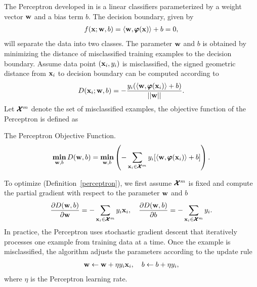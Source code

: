 {The Perceptron developed in \citep{Rosenblatt58,Rosenblatt62} is a linear classifiers parameterized by a weight vector $\mathbf {w}$ and a bias term $b$. 
The decision boundary, given by 
\begin{align*}
	f(\mathbf {x};\mathbf {w},b) = \langle \mathbf {w}, \pmb \varphi(\mathbf {x}) \rangle + b =0,
\end{align*}
will separate the data into two classes.
The parameter $\mathbf {w}$ and $b$ is obtained by minimizing the distance of misclassified training examples to the decision boundary.
Assume data point $(\mathbf {x}_i,y_i)$ is misclassified, the signed geometric distance from $\mathbf {x}_i$ to decision boundary can be computed according to
\begin{align*}
	D(\mathbf {x}_i;\mathbf {w},b) = -\frac{y_i(\langle \mathbf {w}, \pmb \varphi(\mathbf {x}_i) \rangle+b)}{\left|\left| \mathbf {w} \right|\right|}.
\end{align*}
Let $\pmb {\mathcal{X}}^m$ denote the set of misclassified examples, the objective function of the Perceptron is defined as
\begin{definition}{The Perceptron Objective Function.}\label{perceptron}
	\begin{align*}
		\underset{\mathbf {w},b}{\textbf{min}} \, D(\mathbf {w},b) = \underset{\mathbf {w},b}{\textbf{min}} \left( -\sum_{\mathbf {x}_i\in\pmb {\mathcal{X}}^{m}}y_i[\langle \mathbf {w}, \pmb \varphi(\mathbf {x}_i) \rangle+b]\right).
	\end{align*}
\end{definition}
To optimize (Definition~\ref{perceptron}), we first assume $\pmb {\mathcal{X}}^{m}$ is fixed and compute the partial gradient with respect to the parameter $\mathbf {w}$ and $b$
\begin{align*}
	\frac{\partial D(\mathbf {w},b)}{\partial\mathbf {w}} = -\sum_{\mathbf {x}_i\in\pmb {\mathcal{X}}^m}{y_i\mathbf {x}_i},\quad
	\frac{\partial D(\mathbf {w},b)}{\partial b} = -\sum_{\mathbf {x}_i\in\pmb {\mathcal{X}}^m}{y_i}.
\end{align*}
In practice, the Perceptron uses stochastic gradient descent that iteratively processes one example from training data at a time.
Once the example is misclassified, the algorithm adjusts the parameters according to the update rule
\begin{align*}
	\mathbf {w} \leftarrow \mathbf {w} + \eta y_i \mathbf {x}_i, \quad b \leftarrow b + \eta y_i,
\end{align*}
where $\eta$ is the Perceptron learning rate.

}
